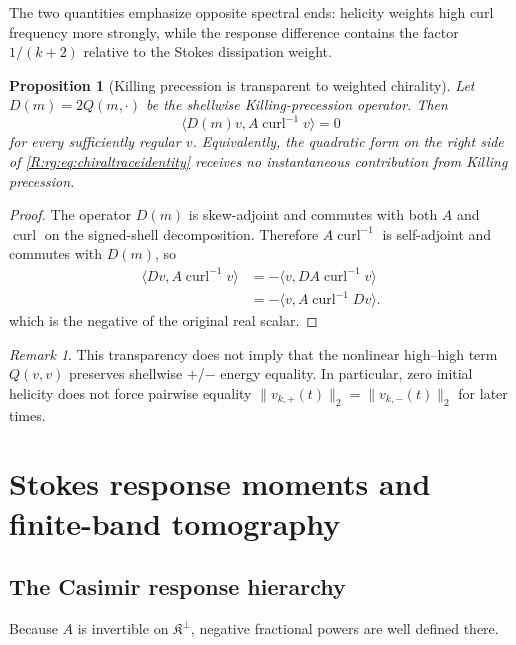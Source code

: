 \documentclass[
 aps,
 prd,
 reprint,
 amsmath,
 amssymb,
 nofootinbib,
 superscriptaddress
]{revtex4-2}
\newtheorem{proposition}[theorem]{Proposition}
\theoremstyle{definition}
\theoremstyle{remark}
\newtheorem{remark}[theorem]{Remark}
\newcommand{\cK}{\mathfrak K}
\newcommand{\curl}{\operatorname{curl}}
\begin{document}
The two quantities emphasize opposite spectral ends: helicity weights high
curl frequency more strongly, while the response difference contains the
factor $1/(k+2)$ relative to the Stokes dissipation weight.

\begin{proposition}[Killing precession is transparent to weighted chirality]
\label{R:rg:prop:precessiontransparent}
Let $D(m)=2Q(m,\cdot)$ be the shellwise Killing-precession operator.  Then
\begin{equation}
 \langle D(m)v,A\curl^{-1}v\rangle=0
 \label{R:rg:eq:weightedtransparent}
\end{equation}
for every sufficiently regular $v$.
Equivalently, the quadratic form on the right side of
\eqref{R:rg:eq:chiraltraceidentity} receives no instantaneous contribution from
Killing precession.
\end{proposition}

\begin{proof}
The operator $D(m)$ is skew-adjoint and commutes with both $A$ and $\curl$
on the signed-shell decomposition.  Therefore
$A\curl^{-1}$ is self-adjoint and commutes with $D(m)$, so
\[
\begin{aligned}
 \langle Dv,A\curl^{-1}v\rangle
 &=
 -\langle v,D A\curl^{-1}v\rangle\\
 &=
 -\langle v,A\curl^{-1}Dv\rangle.
\end{aligned}
\]
which is the negative of the original real scalar.
\end{proof}

\begin{remark}
This transparency does not imply that the nonlinear high--high term
$Q(v,v)$ preserves shellwise $+$/$-$ energy equality.  In particular, zero
initial helicity does not force pairwise equality
$\|v_{k,+}(t)\|_2=\|v_{k,-}(t)\|_2$ for later times.
\end{remark}


\section{Stokes response moments and finite-band tomography}

\subsection{The Casimir response hierarchy}

Because $A$ is invertible on $\cK^\perp$, negative fractional powers are
well defined there.
\end{document}
